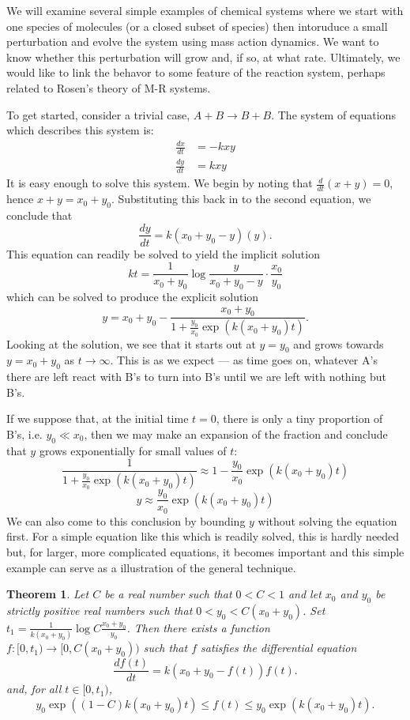 \documentclass[12pt]{article}
\newtheorem{thm}{Theorem}
\begin{document}
We will examine several simple examples of chemical systems where we start with one species 
of molecules (or a closed subset of species) then intoruduce a small perturbation and evolve 
the system using mass action dynamics.  We want to know whether this perturbation will grow
and, if so, at what rate.  Ultimately, we would like to link the behavor to some feature of
the reaction system, perhaps related to Rosen's theory of M-R systems.

To get started, consider a trivial case, $A + B \to B + B$.  The system of equations which
describes this system is:
\begin{align*}
 \frac{dx}{dt} &= -kxy \\
 \frac{dy}{dt} &= kxy
\end{align*}
It is easy enough to solve this system.  We begin by noting that
$\frac{d}{dt} (x + y) =0$, hence $x + y = x_0 + y_0$.
Substituting this back in to the second equation, we conclude
that
\[
 \frac{dy}{dt} = k(x_0 + y_0 - y)(y) .
\]
This equation can readily be solved to yield the implicit solution
\[
 kt = \frac{1}{x_0 + y_0} \log \frac{y}{x_0 + y_0 - y} \cdot \frac{x_0}{y_0}
\]
which can be solved to produce the explicit solution
\[
 y = x_0 + y_0 - \frac{x_0 + y_0}{1 + \frac {y_0}{x_0} \exp(k (x_0 + y_0) t)}.
\]
Looking at the solution, we see that it starts out at $y = y_0$ and grows
towards $y = x_0 + y_0$ as $t \to \infty$.  This is as we expect --- as
time goes on, whatever A's there are left react with B's to turn into B's
until we are left with nothing but B's.

If we suppose that, at the initial time $t = 0$, there is only a tiny 
proportion of B's, i.e. $y_0 \ll x_0$, then we may make an expansion
of the fraction and conclude that $y$ grows exponentially for small
values of $t$:
\[
 \frac{1}{1 + \frac {y_0}{x_0} \exp(k (x_0 + y_0) t)} \approx
 1 - \frac {y_0}{x_0} \exp(k (x_0 + y_0) t)
\]
\[
 y \approx \frac {y_0}{x_0} \exp(k (x_0 + y_0) t)
\]
We can also come to this conclusion by bounding $y$ without solving the
equation first.  For a simple equation like this which is readily solved,
this is hardly needed but, for larger, more complicated equations, it
becomes important and this simple example can serve as a illustration of
the general technique.

\begin{thm}
Let $C$ be a real number such that $0 < C < 1$ and let $x_0$ and $y_0$ be 
strictly positive real numbers such that $0 < y_0 < C (x_0 + y_0)$.
Set $t_1 = \frac{1}{k (x_0 + y_0)} \log C \frac{x_0 + y_0}{y_0}$.  Then 
there exists a function $f \colon [0,t_1) \to [0, C (x_0 + y_0))$ such that
$f$ satisfies the differential equation
\[
 \frac{df(t)}{dt} = k (x_0 + y_0 - f(t)) f(t).
\]
and, for all $t \in [0,t_1)$,
\[
 y_0 \exp ((1 - C) k (x_0 + y_0) t) \le f(t) \le y_0 \exp (k (x_0 + y_0) t)  .
\]
\end{thm}
\end{document}

